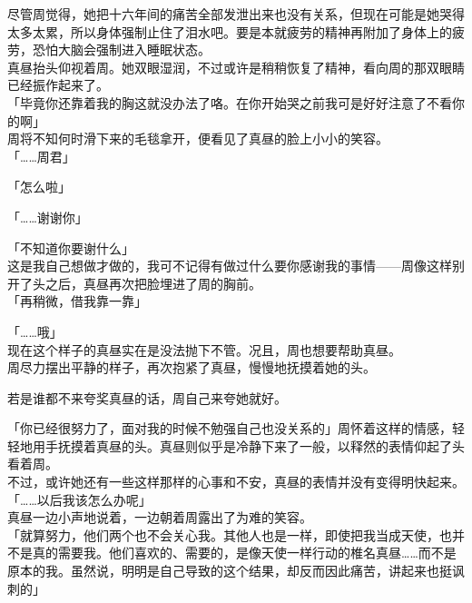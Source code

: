尽管周觉得，她把十六年间的痛苦全部发泄出来也没有关系，但现在可能是她哭得太多太累，所以身体强制止住了泪水吧。要是本就疲劳的精神再附加了身体上的疲劳，恐怕大脑会强制进入睡眠状态。\\

真昼抬头仰视着周。她双眼湿润，不过或许是稍稍恢复了精神，看向周的那双眼睛已经振作起来了。\\

「毕竟你还靠着我的胸这就没办法了咯。在你开始哭之前我可是好好注意了不看你的啊」\\

周将不知何时滑下来的毛毯拿开，便看见了真昼的脸上小小的笑容。\\

「……周君」

「怎么啦」

「……谢谢你」

「不知道你要谢什么」\\

这是我自己想做才做的，我可不记得有做过什么要你感谢我的事情——周像这样别开了头之后，真昼再次把脸埋进了周的胸前。\\

「再稍微，借我靠一靠」

「……哦」\\

现在这个样子的真昼实在是没法抛下不管。况且，周也想要帮助真昼。\\

周尽力摆出平静的样子，再次抱紧了真昼，慢慢地抚摸着她的头。

若是谁都不来夸奖真昼的话，周自己来夸她就好。

「你已经很努力了，面对我的时候不勉强自己也没关系的」周怀着这样的情感，轻轻地用手抚摸着真昼的头。真昼则似乎是冷静下来了一般，以释然的表情仰起了头看着周。\\

不过，或许她还有一些这样那样的心事和不安，真昼的表情并没有变得明快起来。\\

「……以后我该怎么办呢」\\

真昼一边小声地说着，一边朝着周露出了为难的笑容。\\

「就算努力，他们两个也不会关心我。其他人也是一样，即使把我当成天使，也并不是真的需要我。他们喜欢的、需要的，是像天使一样行动的椎名真昼……而不是原本的我。虽然说，明明是自己导致的这个结果，却反而因此痛苦，讲起来也挺讽刺的」\\

